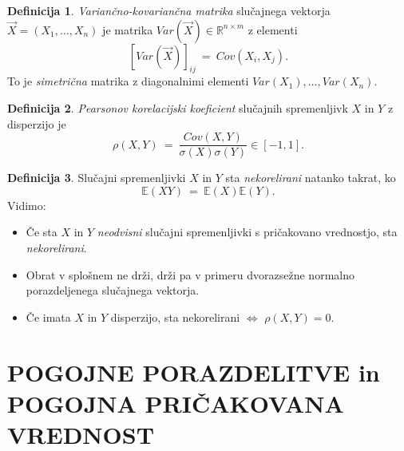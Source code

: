 \documentclass[11pt]{article}
\newcommand{\E}{\mathbb{E}}
\newcommand{\R}{\mathbb{R}}
\newcommand{\1}{\mathbbm{1}}
\theoremstyle{definition}
\newtheorem{definicija}{Definicija}[section]
\theoremstyle{definition}
\theoremstyle{definition}
\begin{document}
\begin{definicija}

\textit{Variančno-kovariančna matrika} slučajnega vektorja $\vec{X} = (X_1, \ldots, X_n)$ je matrika $Var(\vec{X}) \in \R^{n \times m}$ z elementi
$$[Var(\vec{X})]_{ij} ~=~ Cov(X_i, X_j).$$
To je \textit{simetrična} matrika z diagonalnimi elementi $Var(X_1), \ldots, Var(X_n)$.

\end{definicija}
\vspace{0.5cm}

\begin{definicija}

\textit{Pearsonov korelacijski koeficient} slučajnih spremenljivk $X$ in $Y$ z disperzijo je
$$\rho(X, Y) ~=~ \frac{Cov(X, Y)}{\sigma(X)\sigma(Y)} \in [-1, 1].$$

\end{definicija}
\vspace{0.5cm}

\begin{definicija}

Slučajni spremenljivki $X$ in $Y$ sta \textit{nekorelirani} natanko takrat, ko
$$\E(XY) ~=~ \E(X)\E(Y).$$
Vidimo:
\begin{itemize}
	\item Če sta $X$ in $Y$ \textit{neodvisni} slučajni spremenljivki s pričakovano vrednostjo, sta \textit{nekorelirani}.
	
	\item Obrat v splošnem ne drži, drži pa v primeru dvorazsežne normalno porazdeljenega slučajnega vektorja.
	
	\item Če imata $X$ in $Y$ disperzijo, sta nekorelirani $\iff$ $\rho(X, Y) = 0$.
\end{itemize}

\end{definicija}
\vspace{0.5cm}


\pagebreak


\section{POGOJNE PORAZDELITVE in \\POGOJNA PRIČAKOVANA VREDNOST}
\vspace{0.5cm}
\end{document}

